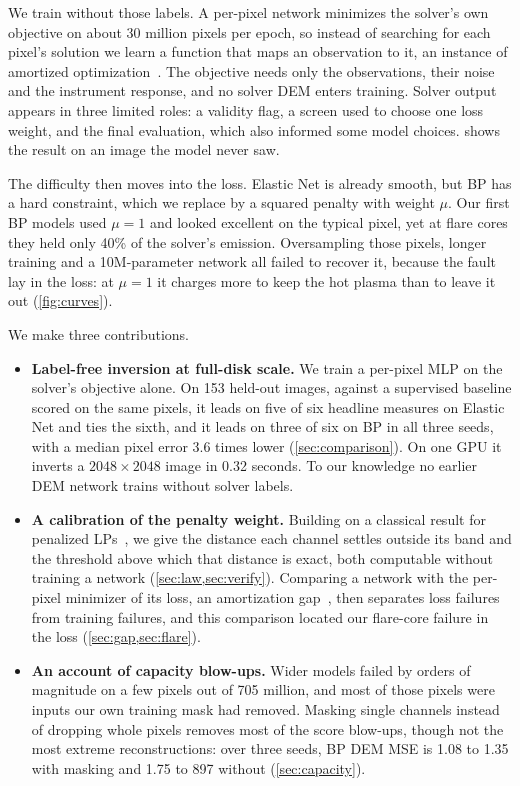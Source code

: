 We train without those labels. A per-pixel network minimizes the solver's own objective on about 30 million pixels per epoch, so instead of searching for each pixel's solution we learn a function that maps an observation to it, an instance of amortized optimization~\cite{amos2023tutorial}. The objective needs only the observations, their noise and the instrument response, and no solver DEM enters training. Solver output appears in three limited roles: a validity flag, a screen used to choose one loss weight, and the final evaluation, which also informed some model choices.  shows the result on an image the model never saw.

The difficulty then moves into the loss. Elastic Net is already smooth, but BP has a hard constraint, which we replace by a squared penalty with weight $\mu$. Our first BP models used $\mu=1$ and looked excellent on the typical pixel, yet at flare cores they held only 40\% of the solver's emission. Oversampling those pixels, longer training and a 10M-parameter network all failed to recover it, because the fault lay in the loss: at $\mu=1$ it charges more to keep the hot plasma than to leave it out (\cref{fig:curves}).

We make three contributions.
\begin{itemize}
\item \textbf{Label-free inversion at full-disk scale.} We train a per-pixel MLP on the solver's objective alone. On 153 held-out images, against a supervised baseline scored on the same pixels, it leads on five of six headline measures on Elastic Net and ties the sixth, and it leads on three of six on BP in all three seeds, with a median pixel error 3.6 times lower (\cref{sec:comparison}). On one GPU it inverts a $2048\times2048$ image in 0.32 seconds. To our knowledge no earlier DEM network trains without solver labels.
\item \textbf{A calibration of the penalty weight.} Building on a classical result for penalized LPs~\cite{mangasarian2004newton}, we give the distance each channel settles outside its band and the threshold above which that distance is exact, both computable without training a network (\cref{sec:law,sec:verify}). Comparing a network with the per-pixel minimizer of its loss, an amortization gap~\cite{cremer2018inference}, then separates loss failures from training failures, and this comparison located our flare-core failure in the loss (\cref{sec:gap,sec:flare}).
\item \textbf{An account of capacity blow-ups.} Wider models failed by orders of magnitude on a few pixels out of 705 million, and most of those pixels were inputs our own training mask had removed. Masking single channels instead of dropping whole pixels removes most of the score blow-ups, though not the most extreme reconstructions: over three seeds, BP DEM MSE is 1.08 to 1.35 with masking and 1.75 to 897 without (\cref{sec:capacity}).
\end{itemize}
